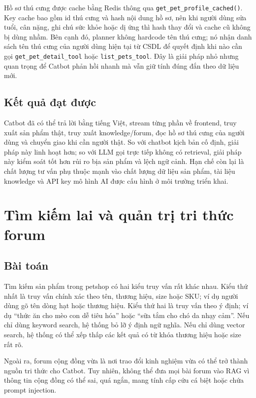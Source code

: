 \documentclass[../DoAn.tex]{subfiles}
\begin{document}
Hồ sơ thú cưng được cache bằng Redis thông qua \texttt{get\_pet\_profile\_cached()}. Key cache bao gồm id thú cưng và hash nội dung hồ sơ, nên khi người dùng sửa tuổi, cân nặng, ghi chú sức khỏe hoặc dị ứng thì hash thay đổi và cache cũ không bị dùng nhầm. Bên cạnh đó, planner không hardcode tên thú cưng; nó nhận danh sách tên thú cưng của người dùng hiện tại từ CSDL để quyết định khi nào cần gọi \texttt{get\_pet\_detail\_tool} hoặc \texttt{list\_pets\_tool}. Đây là giải pháp nhỏ nhưng quan trọng để Catbot phản hồi nhanh mà vẫn giữ tính đúng đắn theo dữ liệu mới.

\subsection{Kết quả đạt được}
\label{subsection:5.1.3}

Catbot đã có thể trả lời bằng tiếng Việt, stream từng phần về frontend, truy xuất sản phẩm thật, truy xuất knowledge/forum, đọc hồ sơ thú cưng của người dùng và chuyển giao khi cần người thật. So với chatbot kịch bản cố định, giải pháp này linh hoạt hơn; so với LLM gọi trực tiếp không có retrieval, giải pháp này kiểm soát tốt hơn rủi ro bịa sản phẩm và lệch ngữ cảnh. Hạn chế còn lại là chất lượng tư vấn phụ thuộc mạnh vào chất lượng dữ liệu sản phẩm, tài liệu knowledge và API key mô hình AI được cấu hình ở môi trường triển khai.

\section{Tìm kiếm lai và quản trị tri thức forum}
\label{section:5.2}

\subsection{Bài toán}
\label{subsection:5.2.1}

Tìm kiếm sản phẩm trong petshop có hai kiểu truy vấn rất khác nhau. Kiểu thứ nhất là truy vấn chính xác theo tên, thương hiệu, size hoặc SKU; ví dụ người dùng gõ tên dòng hạt hoặc thương hiệu. Kiểu thứ hai là truy vấn theo ý định; ví dụ ``thức ăn cho mèo con dễ tiêu hóa'' hoặc ``sữa tắm cho chó da nhạy cảm''. Nếu chỉ dùng keyword search, hệ thống bỏ lỡ ý định ngữ nghĩa. Nếu chỉ dùng vector search, hệ thống có thể xếp thấp các kết quả có từ khóa thương hiệu hoặc size rất rõ.

Ngoài ra, forum cộng đồng vừa là nơi trao đổi kinh nghiệm vừa có thể trở thành nguồn tri thức cho Catbot. Tuy nhiên, không thể đưa mọi bài forum vào RAG vì thông tin cộng đồng có thể sai, quá ngắn, mang tính cấp cứu cá biệt hoặc chứa prompt injection.
\end{document}
